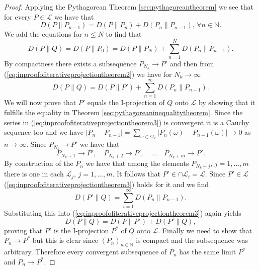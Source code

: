 \documentclass[12pt]{amsart}
\theoremstyle{plain}%
\theoremstyle{definition}
\theoremstyle{remark}
\begin{document}
\begin{proof}
  Applying the Pythagorean Theorem \ref{sec:pythagoreantheorem} we see
  that for every $P \in \mathcal{L}$ we have that
\begin{equation*}
  \label{eq:inproofofiterativeprojectiontheorem1}
  D(P\parallel P_{n-1}) = D(P\parallel P_n) + D(P_n\parallel P_{n-1}), \, \forall n\in\mathbb{N}.
\end{equation*}
We add the equations for $n\leq N$ to find that 
\begin{equation}
  \label{eq:inproofofiterativeprojectiontheorem2}
  D(P\parallel Q) = D(P\parallel P_0) = D(P\parallel P_N) + \sum_{n=1}^N D(P_n\parallel P_{n-1}).
\end{equation}
By compactness there exists a subsequence $P_{N_k} \to P'$ and then from (\ref{eq:inproofofiterativeprojectiontheorem2}) we have for $N_k \to \infty$
\begin{equation}
  \label{eq:inproofofiterativeprojectiontheorem3}
  D(P\parallel Q) = D(P\parallel P') + \sum_{n=1}^\infty D(P_n\parallel P_{n-1}).
\end{equation}
We will now prove that $P'$ equals the I-projection of $Q$ onto
$\mathcal{L}$ by showing that it fulfills the equality in Theorem
\ref{sec:pythagoreaninequalitytheorem}.  Since the series in
(\ref{eq:inproofofiterativeprojectiontheorem3}) is convergent it is a
Cauchy sequence too and we have $|P_n - P_{n-1}| =
\sum_{\omega\in\Omega_V}|P_n(\omega)-P_{n-1}(\omega)| \to 0$ as
$n\to\infty$. Since $P_{N_k} \to P'$ we have that 
\begin{equation*}
  \label{eq:inproofofiterativeprojectiontheorem4}
  P_{N_k+1} \to P', \quad P_{N_k+2} \to P',\quad  \ldots \quad  P_{N_k+m} \to P'.
\end{equation*}
By construction of the $P_n$ we have that among the elements
$P_{N_k+j}, \, j=1,\ldots,m$ there is one in each $\mathcal{L}_j,\,
j=1,\ldots,m$. It follows that $P'\in\cap\mathcal{L}_i = \mathcal{L}$.
Since $P'\in\mathcal{L}$
(\ref{eq:inproofofiterativeprojectiontheorem3}) holds for it and we
find
\begin{equation*}
  \label{eq:inproofofiterativeprojectiontheorem5}
  D(P'\parallel Q) = \sum_{i=1}^\infty D(P_n\parallel P_{n-1}).
\end{equation*}
Substituting this into (\ref{eq:inproofofiterativeprojectiontheorem3})
again yields
\begin{equation*}
  \label{eq:inproofofiterativeprojectiontheorem6}
  D(P\parallel Q) = D(P\parallel P') + D(P'\parallel Q),
\end{equation*}
proving that $P'$ is the I-projection $P^*$ of $Q$ onto $\mathcal{L}$.
Finally we need to show that $P_n \to P^*$ but this is clear since
$(P_n)_{n\in\mathbb{N}}$ is compact and the subsequence was arbitrary.
Therefore every convergent subsequence of $P_n$ has the same limit
$P^*$ and $P_n\to P^*$.
\end{proof}
\end{document}
